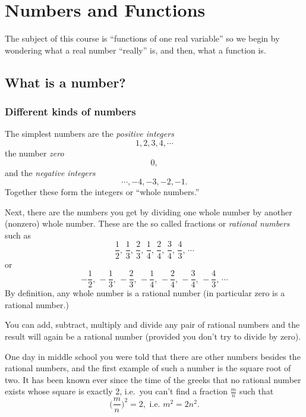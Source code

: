 \chapter{Numbers and Functions}


The subject of this course is ``functions of one real variable'' so we
begin by wondering what a real number ``really'' is, and then, what a
function is.

\section{What is a number?}

\subsection{Different kinds of numbers}
The simplest numbers are the \emph{positive integers}
\[
1, 2, 3, 4,\cdots
\]
the number \emph{zero}
\[
0,
\]
and the \emph{negative integers}
\[
\cdots,-4, -3, -2, -1.
\]
Together these form the integers or ``whole numbers.''

Next, there are the numbers you get by dividing one whole number by another
(nonzero) whole number.  These are the so called fractions or \emph{rational
  numbers} such as
\[
\frac 12,\, \frac13,\, \frac23,\, \frac 14,\,\frac24,\,
\frac34,\, \frac43,\, \cdots
\]
or
\[
-\frac 12,\, -\frac13,\, -\frac23,\, -\frac 14,\,-\frac24,\,
-\frac34,\, -\frac43,\, \cdots
\]
By definition, any whole number is a rational number (in particular zero is a
rational number.)

You can add, subtract, multiply and divide any pair of rational numbers and the
result will again be a rational number (provided you don't try to divide by
zero).

One day in middle school you were told that there are other numbers besides the
rational numbers, and the first example of such a number is the square root of
two.  It has been known ever since the time of the greeks that no rational
number exists whose square is exactly 2, i.e.\ you can't find a fraction $\frac
mn$ such that
\[
\bigl(\frac mn\bigr)^2 = 2, \text{ i.e. }
m^2= 2n^2.
\]

